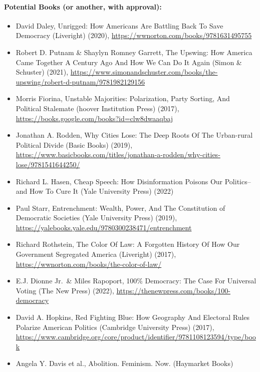 \documentclass[
]{article}
\providecommand{\tightlist}{%
  \setlength{\itemsep}{0pt}\setlength{\parskip}{0pt}}
\begin{document}
\hypertarget{potential-books-or-another-with-approval}{%
\paragraph{Potential Books (or another, with
approval):}\label{potential-books-or-another-with-approval}}

\begin{itemize}
\tightlist
\item
  David Daley, Unrigged: How Americans Are Battling Back To Save
  Democracy (Liveright) (2020),
  \url{https://wwnorton.com/books/9781631495755}
\item
  Robert D. Putnam \& Shaylyn Romney Garrett, The Upswing: How America
  Came Together A Century Ago And How We Can Do It Again (Simon \&
  Schuster) (2021),
  \url{https://www.simonandschuster.com/books/the-upswing/robert-d-putnam/9781982129156}
\item
  Morris Fiorina, Unstable Majorities: Polarization, Party Sorting, And
  Political Stalemate (hoover Institution Press) (2017),
  \url{https://books.google.com/books?id=clw8dwaaqbaj}
\item
  Jonathan A. Rodden, Why Cities Lose: The Deep Roots Of The Urban-rural
  Political Divide (Basic Books) (2019),
  \url{https://www.basicbooks.com/titles/jonathan-a-rodden/why-cities-lose/9781541644250/}
\item
  Richard L. Hasen, Cheap Speech: How Disinformation Poisons Our
  Politics--and How To Cure It (Yale University Press) (2022)
\item
  Paul Starr, Entrenchment: Wealth, Power, And The Constitution of
  Democratic Societies (Yale University Press) (2019),
  \url{https://yalebooks.yale.edu/9780300238471/entrenchment}
\item
  Richard Rothstein, The Color Of Law: A Forgotten History Of How Our
  Government Segregated America (Liveright) (2017),
  \url{https://wwnorton.com/books/the-color-of-law/}
\item
  E.J. Dionne Jr.~\& Miles Rapoport, 100\% Democracy: The Case For
  Universal Voting (The New Press) (2022),
  \url{https://thenewpress.com/books/100-democracy}
\item
  David A. Hopkins, Red Fighting Blue: How Geography And Electoral Rules
  Polarize American Politics (Cambridge University Press) (2017),
  \url{https://www.cambridge.org/core/product/identifier/9781108123594/type/book}
\item
  Angela Y. Davis et al., Abolition. Feminism. Now. (Haymarket Books)

\end{itemize}
\end{document}
